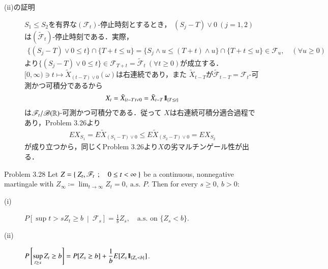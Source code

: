 \begin{prf}
\begin{description}
			\item[(ii)の証明]
				$S_1 \leq S_2$を有界な$(\mathscr{F}_t)$-停止時刻とするとき，
				$(S_j - T) \vee 0\ (j=1,2)$は$(\tilde{\mathscr{F}}_t)$-停止時刻である．実際，
				\begin{align}
					\{(S_j - T) \vee 0 \leq t\} \cap \{T+t \leq u\}
					= \{S_j \wedge u \leq (T+t) \wedge u\} \cap \{T+t \leq u\}
					\in \mathscr{F}_u,
					\quad (\forall u \geq 0)
				\end{align}
				より$\{(S_j - T) \vee 0 \leq t\} \in \mathscr{F}_{T+t} = \tilde{\mathscr{F}}_t\ (\forall t \geq 0)$が成立する．
				$[0,\infty) \ni t \longmapsto \tilde{X}_{(t-T)\vee0}(\omega)$は右連続であり，また
				$\tilde{X}_{t-T}$が$\tilde{\mathscr{F}}_{t-T} = \mathscr{F}_t$-可測かつ可積分であるから
				\begin{align}
					X_t = \tilde{X}_{(t-T)\vee0} = \tilde{X}_{t-T}\mbox{1}\hspace{-0.25em}\mbox{l}_{\{T \leq t\}}
				\end{align}
				は$\mathscr{F}_t/\mathscr{B}(\mathbb{R})$-可測かつ可積分である．従って
				$X$は右連続可積分適合過程であり，Problem 3.26より
				\begin{align}
					EX_{S_1} 
					= E \tilde{X}_{(S_1 - T) \vee 0} 
					\leq E \tilde{X}_{(S_2 - T) \vee 0}
					= EX_{S_2}
				\end{align}
				が成り立つから，同じくProblem 3.26より$X$の劣マルチンゲール性が出る．
				\QED
		\end{description}
	\end{prf}
	
	\begin{itembox}[l]{Problem 3.28}
		Let $Z = \left\{\ Z_t,\mathscr{F}_t\ \, ; \quad 0 \leq t < \infty\ \right\}$ be a continuous, nonnegative martingale with
		$Z_\infty \coloneqq \lim_{t \to \infty} Z_t = 0,\ \mbox{a.s. $P$}$. Then for every $s \geq 0,\ b > 0$:
		\begin{description}
			\item[(i)] $\displaystyle P\left[ \sup{t>s}{Z_t \geq b}\ \middle|\ \mathscr{F}_s \right] = \frac{1}{b} Z_s,
				\quad \mbox{a.s. on $\{Z_s < b\}$}$.
			\item[(ii)] $\displaystyle P\left[ \operatorname*{sup}_{t \geq s} Z_t \geq b \right] = P[Z_s \geq b] + \frac{1}{b} E[Z_s \mbox{1}\hspace{-0.25em}\mbox{l}_{\{Z_s < b\}}]$.
		\end{description}
	\end{itembox}
	
